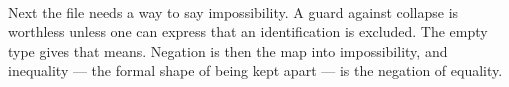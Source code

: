 \documentclass[11pt,a4paper]{book}
\begin{document}
\begin{code}
\AgdaSymbol{:}\AgdaSpace{}%
\AgdaSymbol{\{}\AgdaSpace{}%
\AgdaSpace{}%
\AgdaSymbol{:}\AgdaSpace{}%
\AgdaSymbol{\}}\AgdaSpace{}%
\AgdaSymbol{\{}\AgdaSpace{}%
\AgdaSymbol{:}\AgdaSpace{}%
\AgdaSpace{}%
\AgdaSymbol{\}}\AgdaSpace{}%
\AgdaSymbol{(}\AgdaSpace{}%
\AgdaSymbol{:}\AgdaSpace{}%
\AgdaSpace{}%
\AgdaSpace{}%
\AgdaSpace{}%
\AgdaSymbol{)}\AgdaSpace{}%
\AgdaSymbol{\{}\AgdaSpace{}%
\AgdaSpace{}%
\AgdaSymbol{:}\AgdaSpace{}%
\AgdaSymbol{\}}\AgdaSpace{}%
\AgdaSpace{}%
\AgdaSpace{}%
\AgdaSpace{}%
\AgdaSpace{}%
\AgdaSpace{}%
\AgdaSpace{}%
\AgdaSpace{}%
\AgdaSpace{}%
\AgdaSpace{}%
\<%
\\
\>[0]\AgdaSpace{}%
\AgdaSpace{}%
\AgdaSpace{}%
\AgdaSpace{}%
\AgdaSymbol{=}\AgdaSpace{}%
\<%
\end{code}

Next the file needs a way to say impossibility. A guard against collapse is
worthless unless one can express that an identification is excluded. The
empty type gives that means. Negation is then the map into impossibility,
and inequality --- the formal shape of being kept apart --- is the
negation of equality.
\end{document}
